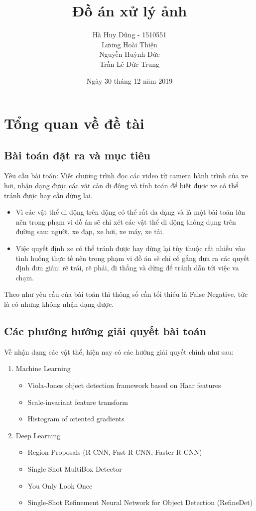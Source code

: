 \documentclass[a4paper,10pt]{article}
\title{Đồ án xử lý ảnh}
\author{Hà Huy Dũng - 1510551 \\Lương Hoài Thiện \\Nguyễn Huỳnh Đức \\Trần Lê Đức Trung}
\date{Ngày 30 tháng 12 năm 2019}
\begin{document}
\maketitle
\tableofcontents
\listoffigures
\listoftables

\section{Tổng quan về đề tài}
	\subsection{Bài toán đặt ra và mục tiêu}
Yêu cầu bài toán: Viết chương trình đọc các video từ camera hành trình của xe hơi, nhận dạng được các vật cản di động và tính toán để biết được xe có thể tránh được hay cần dừng lại.
\begin{itemize}
  \item Vì các vật thể di động trên động có thể rất đa dạng và là một bài toán lớn nên trong phạm vi đồ án sẽ chỉ xét các vật thể di động thông dụng trên đường sau: người, xe đạp, xe hơi, xe máy, xe tải.
  \item Việc quyết định xe có thể tránh được hay dừng lại tùy thuộc rất nhiều vào tình huống thực tế nên trong phạm vi đồ án sẽ chỉ cố gắng đưa ra các quyết định đơn giản: rẽ trái, rẽ phải, đi thẳng và dừng để tránh dẫn tới việc va chạm.
\end{itemize}

Theo như yêu cầu của bài toán thì thông số cần tối thiểu là False Negative, tức là có nhưng không nhận dạng được.
	\subsection{Các phướng hướng giải quyết bài toán}
Về nhận dạng các vật thể, hiện nay có các hướng giải quyết chính như sau:

\begin{enumerate}
  \item Machine Learning
  \begin{itemize}
    \item Viola-Jones object detection framework based on Haar features
    \item Scale-invariant feature transform
    \item Histogram of oriented gradients 
  \end{itemize}
  \item Deep Learning
  \begin{itemize}
    \item Region Proposals (R-CNN, Fast R-CNN, Faster R-CNN)
    \item Single Shot MultiBox Detector
    \item You Only Look Once
    \item Single-Shot Refinement Neural Network for Object Detection (RefineDet)
  \end{itemize}
\end{enumerate}
\end{document}
